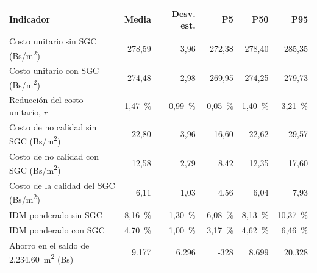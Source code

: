 \begin{tabularx}{\linewidth}{@{}Lrrrrr@{}}
\toprule
\textbf{Indicador} & \textbf{Media} & \textbf{Desv. est.} & \textbf{P5} & \textbf{P50} & \textbf{P95} \\
\midrule
Costo unitario sin SGC (Bs/m\textsuperscript{2}) & 278,59 & 3,96 & 272,38 & 278,40 & 285,35 \\
Costo unitario con SGC (Bs/m\textsuperscript{2}) & 274,48 & 2,98 & 269,95 & 274,25 & 279,73 \\
Reducción del costo unitario, $r$ & 1,47~\% & 0,99~\% & -0,05~\% & 1,40~\% & 3,21~\% \\
Costo de no calidad sin SGC (Bs/m\textsuperscript{2}) & 22,80 & 3,96 & 16,60 & 22,62 & 29,57 \\
Costo de no calidad con SGC (Bs/m\textsuperscript{2}) & 12,58 & 2,79 & 8,42 & 12,35 & 17,60 \\
Costo de la calidad del SGC (Bs/m\textsuperscript{2}) & 6,11 & 1,03 & 4,56 & 6,04 & 7,93 \\
IDM ponderado sin SGC & 8,16~\% & 1,30~\% & 6,08~\% & 8,13~\% & 10,37~\% \\
IDM ponderado con SGC & 4,70~\% & 1,00~\% & 3,17~\% & 4,62~\% & 6,46~\% \\
Ahorro en el saldo de 2.234,60~m\textsuperscript{2} (Bs) & 9.177 & 6.296 & -328 & 8.699 & 20.328 \\
\bottomrule
\end{tabularx}
